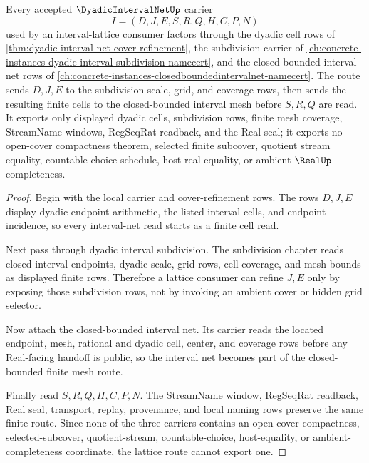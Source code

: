\begin{theorem}
\label{thm:dyadic-interval-net-subdivision-closed-bounded-route}
Every accepted $\DyadicIntervalNetUp$ carrier
$$
I=(D,J,E,S,R,Q,H,C,P,N)
$$
used by an interval-lattice consumer factors through the dyadic cell rows of \autoref{thm:dyadic-interval-net-cover-refinement}, the subdivision carrier of \autoref{ch:concrete-instances-dyadic-interval-subdivision-namecert}, and the closed-bounded interval net rows of \autoref{ch:concrete-instances-closedboundedintervalnet-namecert}. The route sends $D,J,E$ to the subdivision scale, grid, and coverage rows, then sends the resulting finite cells to the closed-bounded interval mesh before $S,R,Q$ are read. It exports only displayed dyadic cells, subdivision rows, finite mesh coverage, StreamName windows, RegSeqRat readback, and the Real seal; it exports no open-cover compactness theorem, selected finite subcover, quotient stream equality, countable-choice schedule, host real equality, or ambient $\RealUp$ completeness.
\end{theorem}
\begin{proof}
Begin with the local carrier and cover-refinement rows. The rows $D,J,E$ display dyadic endpoint arithmetic, the listed interval cells, and endpoint incidence, so every interval-net read starts as a finite cell read.

Next pass through dyadic interval subdivision. The subdivision chapter reads closed interval endpoints, dyadic scale, grid rows, cell coverage, and mesh bounds as displayed finite rows. Therefore a lattice consumer can refine $J,E$ only by exposing those subdivision rows, not by invoking an ambient cover or hidden grid selector.

Now attach the closed-bounded interval net. Its carrier reads the located endpoint, mesh, rational and dyadic cell, center, and coverage rows before any Real-facing handoff is public, so the interval net becomes part of the closed-bounded finite mesh route.

Finally read $S,R,Q,H,C,P,N$. The StreamName window, RegSeqRat readback, Real seal, transport, replay, provenance, and local naming rows preserve the same finite route. Since none of the three carriers contains an open-cover compactness, selected-subcover, quotient-stream, countable-choice, host-equality, or ambient-completeness coordinate, the lattice route cannot export one.
\end{proof}
